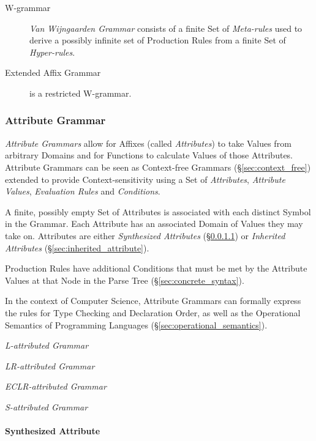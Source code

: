 \begin{description}
\item[W-grammar] \emph{Van Wijngaarden Grammar} consists of a finite
  Set of \emph{Meta-rules} used to derive a possibly infinite set of
  Production Rules from a finite Set of \emph{Hyper-rules}.
\item[Extended Affix Grammar] is a restricted W-grammar.
\end{description}



\subsubsection{Attribute Grammar}\label{sec:attribute_grammar}
\cite{slonneger-kurtz95}

\emph{Attribute Grammars} allow for Affixes (called \emph{Attributes})
to take Values from arbitrary Domains and for Functions to calculate
Values of those Attributes. Attribute Grammars can be seen as
Context-free Grammars (\S\ref{sec:context_free}) extended to provide
Context-sensitivity using a Set of \emph{Attributes}, \emph{Attribute
  Values}, \emph{Evaluation Rules} and \emph{Conditions}.

A finite, possibly empty Set of Attributes is associated with each
distinct Symbol in the Grammar. Each Attribute has an associated
Domain of Values they may take on. Attributes are either
\emph{Synthesized Attributes} (\S\ref{sec:synthesized_attribute}) or
\emph{Inherited Attributes} (\S\ref{sec:inherited_attribute}).

Production Rules have additional Conditions that must be met by the
Attribute Values at that Node in the Parse Tree
(\S\ref{sec:concrete_syntax}).

In the context of Computer Science, Attribute Grammars can formally
express the rules for Type Checking and Declaration Order, as well as
the Operational Semantics of Programming Languages
(\S\ref{sec:operational_semantics}).

\emph{L-attributed Grammar}

\emph{LR-attributed Grammar}

\emph{ECLR-attributed Grammar}

\emph{S-attributed Grammar}



\paragraph{Synthesized Attribute}\label{sec:synthesized_attribute}\hfill

